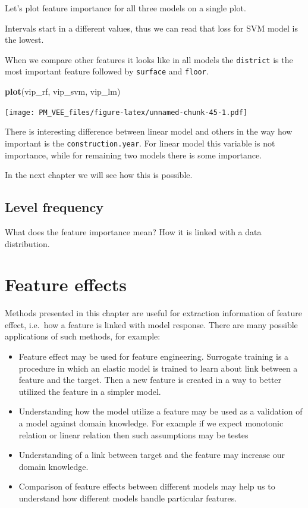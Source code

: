 \documentclass[]{krantz}
\newenvironment{Shaded}{\begin{snugshade}}{\end{snugshade}}
\newcommand{\KeywordTok}[1]{\textcolor[rgb]{0.13,0.29,0.53}{\textbf{#1}}}
\newcommand{\NormalTok}[1]{#1}
\providecommand{\tightlist}{%
  \setlength{\itemsep}{0pt}\setlength{\parskip}{0pt}}
\theoremstyle{definition}
\theoremstyle{definition}
\theoremstyle{definition}
\theoremstyle{remark}
\begin{document}
Let's plot feature importance for all three models on a single plot.

Intervals start in a different values, thus we can read that loss for
SVM model is the lowest.

When we compare other features it looks like in all models the
\texttt{district} is the most important feature followed by
\texttt{surface} and \texttt{floor}.

\begin{Shaded}
\begin{Highlighting}[]
\KeywordTok{plot}\NormalTok{(vip_rf, vip_svm, vip_lm)}
\end{Highlighting}
\end{Shaded}

\texttt{[image: PM\_VEE\_files/figure-latex/unnamed-chunk-45-1.pdf]}

There is interesting difference between linear model and others in the
way how important is the \texttt{construction.year}. For linear model
this variable is not importance, while for remaining two models there is
some importance.

In the next chapter we will see how this is possible.

\hypertarget{level-frequency}{%
\subsection{Level frequency}\label{level-frequency}}

What does the feature importance mean? How it is linked with a data
distribution.

\hypertarget{variableEngeneering}{%
\section{Feature effects}\label{variableEngeneering}}

Methods presented in this chapter are useful for extraction information
of feature effect, i.e.~how a feature is linked with model response.
There are many possible applications of such methods, for example:

\begin{itemize}
\tightlist
\item
  Feature effect may be used for feature engineering. Surrogate training
  is a procedure in which an elastic model is trained to learn about
  link between a feature and the target. Then a new feature is created
  in a way to better utilized the feature in a simpler model.
\item
  Understanding how the model utilize a feature may be used as a
  validation of a model against domain knowledge. For example if we
  expect monotonic relation or linear relation then such assumptions may
  be testes
\item
  Understanding of a link between target and the feature may increase
  our domain knowledge.
\item
  Comparison of feature effects between different models may help us to
  understand how different models handle particular features.
\end{itemize}
\end{document}
